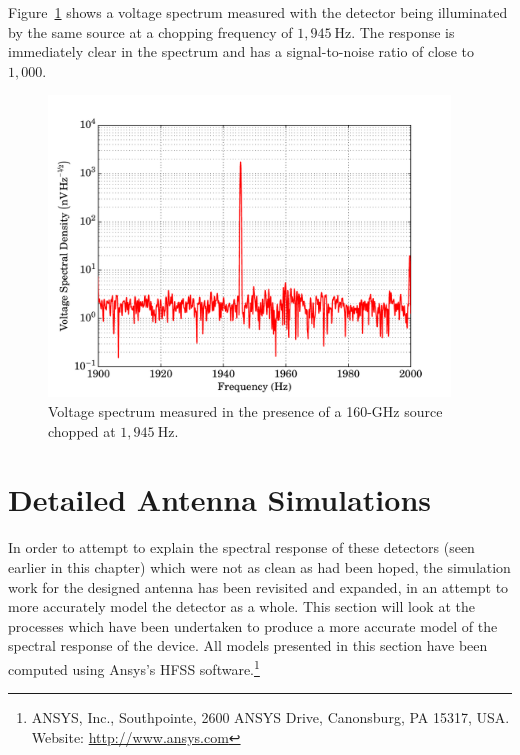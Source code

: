\par 
Figure~\ref{fig:strainedChopped_freq} shows a voltage spectrum measured with the detector being illuminated by the same source at a chopping frequency of $1,945~\mathrm{Hz}$. The response is immediately clear in the spectrum and has a signal-to-noise ratio of close to $1,000$.
\begin{figure}[tb]
\begin{center}
\includegraphics[width = 0.95\textwidth]{figures/strained_chopped}
\caption[Voltage spectrum measured in the presence of a 160-GHz source chopped at $1,945~\mathrm{Hz}$]{Voltage spectrum measured in the presence of a 160-GHz source chopped at $1,945~\mathrm{Hz}$.}
\label{fig:strainedChopped_freq}
\end{center}
\end{figure}
%
\section{Detailed Antenna Simulations}\label{sec:antennaSims}
In order to attempt to explain the spectral response of these detectors (seen earlier in this chapter) which were not as clean as had been hoped, the simulation work for the designed antenna has been revisited and expanded, in an attempt to more accurately model the detector as a whole. This section will look at the processes which have been undertaken to produce a more accurate model of the spectral response of the device. All models presented in this section have been computed using Ansys's HFSS software.\footnote{ANSYS, Inc., Southpointe, 2600 ANSYS Drive, Canonsburg, PA 15317, USA. Website: \url{http://www.ansys.com}}
%
